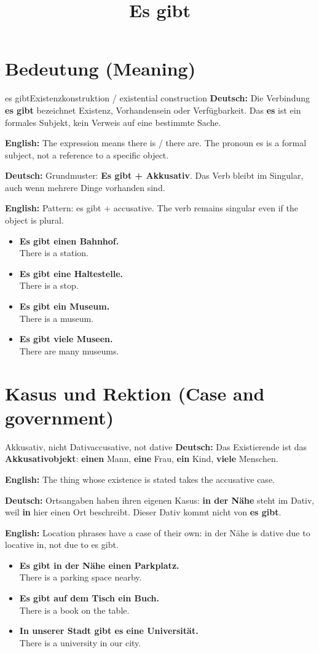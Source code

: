 \documentclass[a4paper,11pt]{article}
\title{Es gibt}
\date{}
\newcommand{\GermanText}[1]{\textbf{Deutsch: }#1\par}
\newcommand{\EnglishText}[1]{{\small\color{SoftGray}\textbf{English: }#1\par}}
\newcommand{\ExampleItem}[2]{\item \textbf{#1}\\{\small\color{SoftGray}#2}}
\begin{document}
   \maketitle
   \tableofcontents
   \newpage
   \section{Bedeutung (Meaning)}
      \begin{grammarentry}{es gibt}{Existenzkonstruktion / existential construction}
         \GermanText{Die Verbindung \textbf{es gibt} bezeichnet Existenz, Vorhandensein oder Verfügbarkeit. Das \textbf{es} ist ein formales Subjekt, kein Verweis auf eine bestimmte Sache.}
         \EnglishText{The expression means there is / there are. The pronoun es is a formal subject, not a reference to a specific object.}
         \GermanText{Grundmuster: \textbf{Es gibt + Akkusativ}. Das Verb bleibt im Singular, auch wenn mehrere Dinge vorhanden sind.}
         \EnglishText{Pattern: es gibt + accusative. The verb remains singular even if the object is plural.}
      \end{grammarentry}
      \begin{exbox}\begin{itemize}
         \ExampleItem{Es gibt einen Bahnhof.}{There is a station.}
         \ExampleItem{Es gibt eine Haltestelle.}{There is a stop.}
         \ExampleItem{Es gibt ein Museum.}{There is a museum.}
         \ExampleItem{Es gibt viele Museen.}{There are many museums.}
         \end{itemize}\end{exbox}
   \section{Kasus und Rektion (Case and government)}
         \begin{grammarentry}{Akkusativ, nicht Dativ}{accusative, not dative}
            \GermanText{Das Existierende ist das \textbf{Akkusativobjekt}: \textbf{einen} Mann, \textbf{eine} Frau, \textbf{ein} Kind, \textbf{viele} Menschen.}
            \EnglishText{The thing whose existence is stated takes the accusative case.}
            \GermanText{Ortsangaben haben ihren eigenen Kasus: \textbf{in der Nähe} steht im Dativ, weil \textbf{in} hier einen Ort beschreibt. Dieser Dativ kommt nicht von \textbf{es gibt}.}
            \EnglishText{Location phrases have a case of their own: in der Nähe is dative due to locative in, not due to es gibt.}
         \end{grammarentry}
         \begin{exbox}\begin{itemize}
            \ExampleItem{Es gibt in der Nähe einen Parkplatz.}{There is a parking space nearby.}
            \ExampleItem{Es gibt auf dem Tisch ein Buch.}{There is a book on the table.}
            \ExampleItem{In unserer Stadt gibt es eine Universität.}{There is a university in our city.}
            \end{itemize}\end{exbox}
\end{document}

